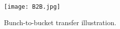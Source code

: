 %
%
%
%
\begin{figure}[H]
   \centering   
   \texttt{[image: B2B.jpg]}
   \caption{Bunch-to-bucket transfer illustration.}
   \label{B2B}
\end{figure}

